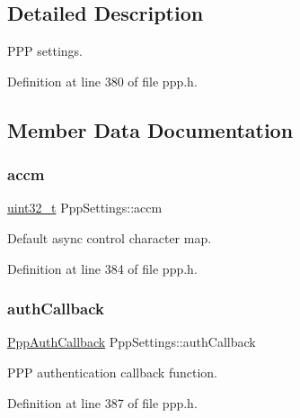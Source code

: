 \subsection{Detailed Description}
P\+PP settings. 

Definition at line 380 of file ppp.\+h.



\subsection{Member Data Documentation}
\mbox{\label{structPppSettings_a5b90c3b4cf91d8ad6ed514b72fe5df06}} 
\subsubsection{\texorpdfstring{accm}{accm}}
{\footnotesize\ttfamily \hyperlink{stdint_8h_a435d1572bf3f880d55459d9805097f62}{uint32\+\_\+t} Ppp\+Settings\+::accm}



Default async control character map. 



Definition at line 384 of file ppp.\+h.

\mbox{\label{structPppSettings_a4b619da9280c64b1494efa226a1cdf07}} 
\subsubsection{\texorpdfstring{auth\+Callback}{authCallback}}
{\footnotesize\ttfamily \hyperlink{ppp_8h_aa73df69aa2d4dfe90d40921e51ac8fcd}{Ppp\+Auth\+Callback} Ppp\+Settings\+::auth\+Callback}



P\+PP authentication callback function. 



Definition at line 387 of file ppp.\+h.

\mbox{\label{structPppSettings_a81721d1a0829cda028bee35921661eb6}} 
